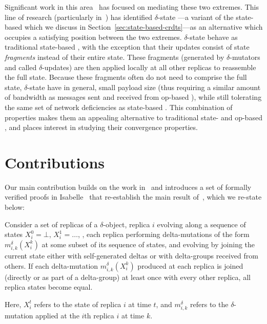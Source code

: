 Significant work in this area~\cite{almedia18, enes18, cabrita17, vanDerLinde16}
has focused on mediating these two extremes. This line of research (particularly
in~\citep{almedia18}) has identified $\delta$-state \CRDTs---a variant of the
state-based \CRDT which we discuss in Section~\ref{sec:state-based-crdts}---as
an alternative which occupies a satisfying position between the two extremes.
$\delta$-state \CRDTs behave as traditional state-based \CRDTs, with the
exception that their updates consist of state \emph{fragments} instead of their
entire state. These fragments (generated by $\delta$-mutators and called
$\delta$-updates) are then applied locally at all other replicas to reassemble
the full state. Because these fragments often do not need to comprise the full
state, $\delta$-state \CRDTs have in general, small payload size (thus requiring
a similar amount of bandwidth as messages sent and received from op-based
\CRDTs), while still tolerating the same set of network deficiencies as
state-based \CRDTs. This combination of properties makes them an appealing
alternative to traditional state- and op-based \CRDTs, and places interest in
studying their convergence properties.

\section{Contributions}

Our main contribution builds on the work in~\citep{gomes17} and introduces a set
of formally verified proofs in Isabelle~\citep{wenzel02} that re-establish the
main result of~\citep{almedia18}, which we re-state below:

\begin{theorem}
  Consider a set of replicas of a $\delta$-\CRDT object, replica $i$ evolving
  along a sequence of states $X_i^0 = \bot$, $X_i^1=\ldots$, , each replica
  performing delta-mutations of the form $m^\delta_{i,k}(X^k_i)$ at some subset
  of its sequence of states, and evolving by joining the current state either
  with self-generated deltas or with delta-groups received from others. If each
  delta-mutation $m^\delta _{i,k}(X^k_i)$ produced at each replica is joined
  (directly or as part of a delta-group) at least once with every other replica,
  all replica states become equal.
\end{theorem}

Here, $X_i^t$ refers to the state of replica $i$ at time $t$, and
$m^\delta_{i,k}$ refers to the $\delta$-mutation applied at the $i$th replica
$i$ at time $k$.

